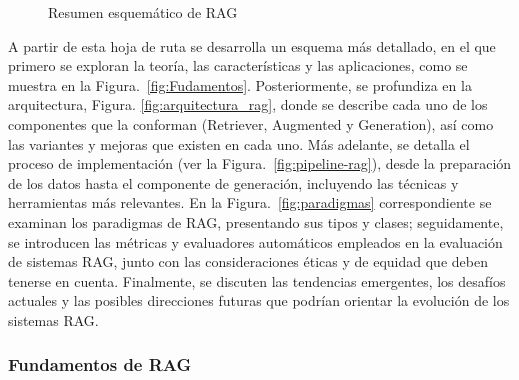 \begin{figure}[H]
\begin{center}
\end{center}
\caption{Resumen esquemático de RAG}
\label{fig:secciones-rag}
\end{figure}

A partir de esta hoja de ruta se desarrolla un esquema más detallado, en el que primero se exploran la teoría, 
las características y las aplicaciones, como se muestra en la Figura.~\ref{fig:Fudamentos}. Posteriormente, se profundiza en la arquitectura, Figura. \ref{fig:arquitectura_rag}, 
donde se describe cada uno de los componentes que la conforman (Retriever, Augmented y Generation), así como las variantes y mejoras que existen en cada uno. 
Más adelante, se detalla el proceso de implementación (ver la  Figura.~\ref{fig:pipeline-rag}), desde la preparación de los datos hasta el componente de generación, incluyendo las técnicas y herramientas más relevantes.  
En la Figura.~\ref{fig:paradigmas} correspondiente se examinan los paradigmas de RAG, presentando sus tipos y clases; seguidamente, se introducen las métricas y evaluadores automáticos 
empleados en la evaluación de sistemas RAG, junto con las consideraciones éticas y de equidad que deben tenerse en cuenta.  
Finalmente, se discuten las tendencias emergentes, los desafíos actuales y las posibles direcciones futuras que podrían orientar la evolución de los sistemas RAG.  





\subsubsection{Fundamentos de RAG}

